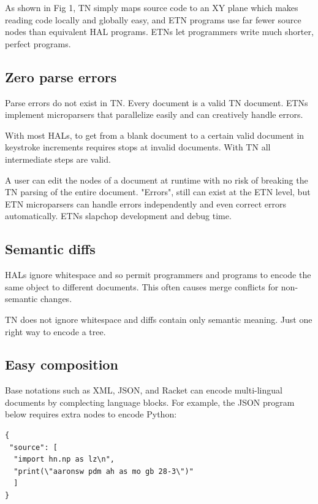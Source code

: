 \documentclass[journal]{IEEEtran}
\begin{document}
As shown in Fig 1, TN simply maps source code to an XY plane which makes reading code locally and globally easy, and ETN programs use far fewer source nodes than equivalent HAL programs. ETNs let programmers write much shorter, perfect programs.

\subsection{Zero parse errors}

Parse errors do not exist in TN. Every document is a valid TN document. ETNs implement microparsers that parallelize easily and can creatively handle errors.

With most HALs, to get from a blank document to a certain valid document in keystroke increments requires stops at invalid documents. With TN all intermediate steps are valid.

A user can edit the nodes of a document at runtime with no risk of breaking the TN parsing of the entire document. "Errors", still can exist at the ETN level, but ETN microparsers can handle errors independently and even correct errors automatically. ETNs slapchop development and debug time.

\subsection{Semantic diffs}

HALs ignore whitespace and so permit programmers and programs to encode the same object to different documents. This often causes merge conflicts for non-semantic changes.

TN does not ignore whitespace and diffs contain only semantic meaning. Just one right way to encode a tree.

\subsection{Easy composition}

Base notations such as XML\cite{Bray}, JSON\cite{Crockford}, and Racket\cite{Racket} can encode multi-lingual documents by complecting language blocks. For example, the JSON program below requires extra nodes to encode Python:

\begin{lstlisting}
{
 "source": [
  "import hn.np as lz\n",
  "print(\"aaronsw pdm ah as mo gb 28-3\")"
  ]
}
\end{lstlisting}
\end{document}

